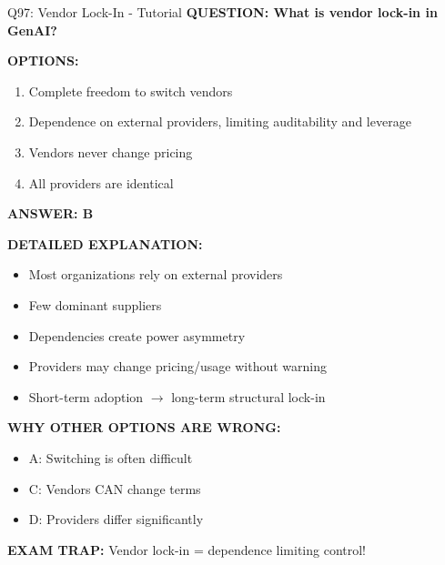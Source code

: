\documentclass[8pt]{beamer}
\begin{document}
	\begin{frame}{Q97: Vendor Lock-In - Tutorial}
		\fontsize{6.5}{7.5}\selectfont
		\textbf{QUESTION: What is vendor lock-in in GenAI?}
		
		\vspace{0.1cm}
		\textbf{OPTIONS:}
		\begin{enumerate}
			\item Complete freedom to switch vendors
			\item Dependence on external providers, limiting auditability and leverage
			\item Vendors never change pricing
			\item All providers are identical
		\end{enumerate}
		
		\vspace{0.1cm}
		\textcolor{myblue}{\textbf{ANSWER: B}}
		
		\vspace{0.1cm}
		\textbf{DETAILED EXPLANATION:}
		\begin{itemize}
			\item Most organizations rely on external providers
			\item Few dominant suppliers
			\item Dependencies create power asymmetry
			\item Providers may change pricing/usage without warning
			\item Short-term adoption $\to$ long-term structural lock-in
		\end{itemize}
		
		\vspace{0.1cm}
		\textcolor{myred}{\textbf{WHY OTHER OPTIONS ARE WRONG:}}
		\begin{itemize}
			\item \textcolor{myred}{A:} Switching is often difficult
			\item \textcolor{myred}{C:} Vendors CAN change terms
			\item \textcolor{myred}{D:} Providers differ significantly
		\end{itemize}
		
		\textcolor{myred}{\textbf{EXAM TRAP:}} Vendor lock-in = \textcolor{myblue}{dependence limiting control}!
	\end{frame}
	
\end{document}
